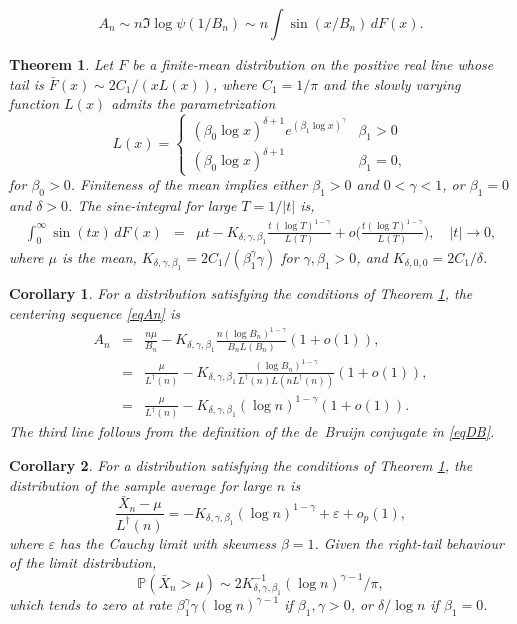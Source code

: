 \documentclass[10pt,a4paper]{amsart}
\newtheorem{theorem}{Theorem}
\newtheorem{corollary}{Corollary}
\def\Prob{{\mathbb P}}
\begin{document}
\begin{equation}\label{eqAn}
A_n \sim n \Im \log \psi(1/B_n) \sim n \int \sin(x/B_n) \, dF(x).
\end{equation}

\begin{theorem}\label{thmSinIntegral}
	Let $F$ be a finite-mean distribution on the positive real line whose tail is $\bar F(x) \sim 2C_1/(x L(x))$, where $C_1=1/\pi$ and the slowly varying function $L(x)$ admits the parametrization
	\begin{equation}\label{eqLParam}
	L(x) = \left\{ \begin{array}{ll}(\beta_0\log x)^{\delta + 1} e^{(\beta_1\log x)^\gamma} & \beta_1> 0 \\
	(\beta_0\log x)^{\delta + 1} & \beta_1 = 0,
	\end{array}\right.
	\end{equation}
	for $\beta_0>0$. Finiteness of the mean implies either $\beta_1>0$ and $0 < \gamma < 1$,	or $\beta_1 = 0$ and $\delta > 0$. The sine-integral for large $T = 1/|t|$ is,
	\begin{eqnarray*}
		\int_0^\infty \sin (t x)  \, dF(x) 
		&=& \mu t - K_{\delta,\gamma,\beta_1}  \frac{t\,(\log T)^{1-\gamma}} {L(T)} +o\biggl(\frac {t (\log T)^{1-\gamma}} {L(T)} \biggr), \quad |t|\rightarrow 0,
	\end{eqnarray*}
	where $\mu$ is the mean, $K_{\delta,\gamma, \beta_1} = 2C_1/ (\beta_1^{\gamma}\gamma)$ for $\gamma, \beta_1 > 0$, and $K_{\delta,0,0} = 2C_1/\delta$.
\end{theorem}

\begin{corollary}\label{corollAn}
	For a distribution satisfying the conditions of Theorem \ref{thmSinIntegral}, the centering sequence \eqref{eqAn} is 
	\begin{eqnarray*}
		A_n &=& \frac {n \mu} {B_n} - K_{\delta,\gamma,\beta_1}  \frac{n (\log B_n)^{1-\gamma}}  {B_n L(B_n)} (1 + o(1)),\\
		&=& \frac {\mu} {L^\dagger(n)} - K_{\delta,\gamma,\beta_1}  \frac{(\log B_n)^{1-\gamma}} {L^\dagger(n) L(n L^\dagger(n))}(1 + o(1)), \\
		&=& \frac {\mu} {L^\dagger(n)} - K_{\delta,\gamma,\beta_1}(\log n)^{1-\gamma} (1 + o(1)).
	\end{eqnarray*}
	The third line follows from the definition of the de~Bruijn conjugate in \eqref{eqDB}.
\end{corollary}

\begin{corollary}\label{corollXbar}
	For a distribution satisfying the conditions of Theorem \ref{thmSinIntegral}, the distribution of the sample average for large $n$ is
	\[
	\frac{\bar X_n - \mu} {L^\dagger(n)} = - K_{\delta,\gamma,\beta_1}  (\log n)^{1-\gamma} + \varepsilon + o_p(1),
	\]
	where $\varepsilon$ has the Cauchy limit with skewness $\beta=1$.
	Given the right-tail behaviour of the limit distribution,
	\[
	\Prob(\bar X_n > \mu) \sim 2 K_{\delta,\gamma,\beta_1}^{-1} (\log n)^{\gamma-1} / \pi, 
	\]
	which tends to zero at rate $\beta_1^\gamma \gamma (\log n)^{\gamma-1}$ if $\beta_1,\gamma > 0$, or $\delta/\log n$ if $\beta_1=0$.
\end{corollary}
\end{document}
